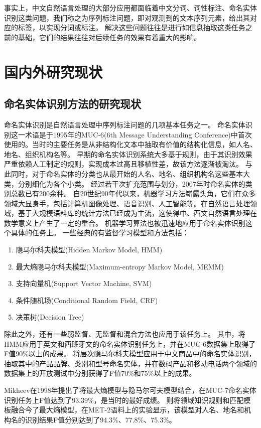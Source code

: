 事实上，中文自然语言处理的大部分应用都面临着中文分词、词性标注、命名实体识别这类问题，我们称之为序列标注问题，即对观测到的文本序列元素，给出其对应的标签，以实现分词或标注。
解决这些问题往往是进行如信息抽取这类任务之前的基础，它们的结果往往对后续任务的效果有着重大的影响。

\section{国内外研究现状}
\label{sec:current}
\subsection{命名实体识别方法的研究现状}
命名实体识别是自然语言处理中序列标注问题的几项基本任务之一。
命名实体识别这一术语是于1995年的MUC-6(6th Message Understanding Conference)中首次使用的。当时的主要任务是从非结构化文本中抽取有价值的结构化信息，如人名、地名、组织机构名等。
早期的命名实体识别系统大多基于规则，由于其识别效果严重依赖人工制定的规则，实现成本过高且移植性差，故该方法逐渐被淘汰。
与此同时，对于命名实体的分类也从最开始的人名、地名、组织机构名这些基本大类，分别细化为各个小类。
经过若干次扩充范围与划分，2007年时命名实体的类别总数已有200余种。
自20世纪90年代以来，机器学习方法崭露头角，它们在众多领域大显身手，包括计算机图像处理、语音识别、人工智能等。在自然语言处理领域，基于大规模语料库的统计方法已经成为主流，这使得中、西文自然语言处理在数学意义上产生了一定的重合。
机器学习算法也被迅速地应用于命名实体识别这个具体的任务上。
一些经典的有监督学习模型和方法包括：
\begin{enumerate}[（1）]
    \item 隐马尔科夫模型(Hidden Markov Model, HMM)
    \item 最大熵隐马尔科夫模型(Maximum-entropy Markov Model, MEMM)
    \item 支持向量机(Support Vector Machine, SVM)
    \item 条件随机场(Conditional Random Field, CRF)
    \item 决策树(Decision Tree)
\end{enumerate}
除此之外，还有一些弱监督、无监督和混合方法也应用于该任务上。
其中，\citet{bikel1997nymble}将HMM应用于英文和西班牙文的命名实体识别任务上，并在MUC-6数据集上取得了F值90\%以上的成果。
\citet{liu2005product}将层次隐马尔科夫模型应用于中文商品中的命名实体识别，抽取其中的产品品牌、类别和型号命名实体，并在数码产品和移动电话两个领域的数据集上的开放测试中分别获得了F值70\%和75\%以上的成果。

Mikheev\citep{mikheev1998description}在1998年提出了将最大熵模型与隐马尔可夫模型结合，在MUC-7命名实体识别任务上F值达到了93.39\%，是当时的最好成绩。
\citet{tsai2004mencius}则将领域知识规则和匹配模板融合今了最大熵模型，在MET-2语料上的实验显示，该模型对人名、地名和机构名的识别结果F值分别达到了94.3\%、77.8\%、75.3\%。

